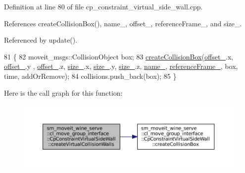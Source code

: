 Definition at line 80 of file cp\+\_\+constraint\+\_\+virtual\+\_\+side\+\_\+wall.\+cpp.



References create\+Collision\+Box(), name\+\_\+, offset\+\_\+, reference\+Frame\+\_\+, and size\+\_\+.



Referenced by update().


\begin{DoxyCode}
81         \{
82             moveit\_msgs::CollisionObject box;
83             \hyperlink{classsm__moveit__wine__serve_1_1cl__move__group__interface_1_1CpConstraintVirtualSideWall_a52617a140c7a19b4f0a08804c3a8d3a6}{createCollisionBox}(\hyperlink{classsm__moveit__wine__serve_1_1cl__move__group__interface_1_1CpConstraintVirtualSideWall_a15fabbe74d1611af8c7c88ee580b30f6}{offset\_}.x, \hyperlink{classsm__moveit__wine__serve_1_1cl__move__group__interface_1_1CpConstraintVirtualSideWall_a15fabbe74d1611af8c7c88ee580b30f6}{offset\_}.y , 
      \hyperlink{classsm__moveit__wine__serve_1_1cl__move__group__interface_1_1CpConstraintVirtualSideWall_a15fabbe74d1611af8c7c88ee580b30f6}{offset\_}.z, \hyperlink{classsm__moveit__wine__serve_1_1cl__move__group__interface_1_1CpConstraintVirtualSideWall_af00e8ef9042a797b749888256e0d36f4}{size\_}.x, \hyperlink{classsm__moveit__wine__serve_1_1cl__move__group__interface_1_1CpConstraintVirtualSideWall_af00e8ef9042a797b749888256e0d36f4}{size\_}.y, \hyperlink{classsm__moveit__wine__serve_1_1cl__move__group__interface_1_1CpConstraintVirtualSideWall_af00e8ef9042a797b749888256e0d36f4}{size\_}.z, \hyperlink{classsm__moveit__wine__serve_1_1cl__move__group__interface_1_1CpConstraintVirtualSideWall_abe1e7ae9ca5d54953ffaaa8d85ff16ac}{name\_}, 
      \hyperlink{classsm__moveit__wine__serve_1_1cl__move__group__interface_1_1CpConstraintVirtualSideWall_a832273800ad6780a7b3cd35bc58e4e75}{referenceFrame\_}, box, time, addOrRemove);
84             collisions.push\_back(box);
85         \}
\end{DoxyCode}
Here is the call graph for this function\+:
\nopagebreak
\begin{figure}[H]
\begin{center}
\leavevmode
\includegraphics[width=350pt]{classsm__moveit__wine__serve_1_1cl__move__group__interface_1_1CpConstraintVirtualSideWall_a98576104cf4c349341031848477b2d5b_cgraph}
\end{center}
\end{figure}
